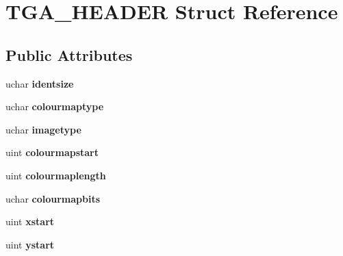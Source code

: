 \hypertarget{struct_t_g_a___h_e_a_d_e_r}{
\section{TGA\_\-HEADER Struct Reference}
\label{struct_t_g_a___h_e_a_d_e_r}
}
\subsection*{Public Attributes}
\begin{DoxyCompactItemize}
\item 
\hypertarget{struct_t_g_a___h_e_a_d_e_r_a4a98188c23f050fc313a788cf4b7c0ca}{
uchar {\bfseries identsize}}
\label{struct_t_g_a___h_e_a_d_e_r_a4a98188c23f050fc313a788cf4b7c0ca}

\item 
\hypertarget{struct_t_g_a___h_e_a_d_e_r_ae6fd9dc3ace8efeb26b2b0d4fbbb31fb}{
uchar {\bfseries colourmaptype}}
\label{struct_t_g_a___h_e_a_d_e_r_ae6fd9dc3ace8efeb26b2b0d4fbbb31fb}

\item 
\hypertarget{struct_t_g_a___h_e_a_d_e_r_aee0c49a96633f04f96b6f68798b6ef12}{
uchar {\bfseries imagetype}}
\label{struct_t_g_a___h_e_a_d_e_r_aee0c49a96633f04f96b6f68798b6ef12}

\item 
\hypertarget{struct_t_g_a___h_e_a_d_e_r_ad9a22417498be85be8309a0d417b6fbe}{
uint {\bfseries colourmapstart}}
\label{struct_t_g_a___h_e_a_d_e_r_ad9a22417498be85be8309a0d417b6fbe}

\item 
\hypertarget{struct_t_g_a___h_e_a_d_e_r_a774aa8bafc876e3d987e935a74dbf0e7}{
uint {\bfseries colourmaplength}}
\label{struct_t_g_a___h_e_a_d_e_r_a774aa8bafc876e3d987e935a74dbf0e7}

\item 
\hypertarget{struct_t_g_a___h_e_a_d_e_r_a5e436d12ff3dd9bffe930c393602754a}{
uchar {\bfseries colourmapbits}}
\label{struct_t_g_a___h_e_a_d_e_r_a5e436d12ff3dd9bffe930c393602754a}

\item 
\hypertarget{struct_t_g_a___h_e_a_d_e_r_addc1d1606cd3501556d2a254b61e9fa2}{
uint {\bfseries xstart}}
\label{struct_t_g_a___h_e_a_d_e_r_addc1d1606cd3501556d2a254b61e9fa2}

\item 
\hypertarget{struct_t_g_a___h_e_a_d_e_r_afce385cea648621cdac2f2e8bf928417}{
uint {\bfseries ystart}}
\label{struct_t_g_a___h_e_a_d_e_r_afce385cea648621cdac2f2e8bf928417}


\end{DoxyCompactItemize}
